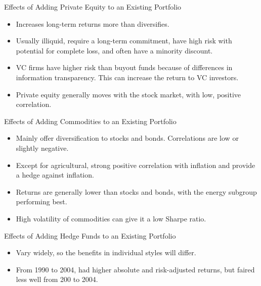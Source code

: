 \documentclass[../custom,grid]{flashcards}
\begin{document}
\begin{flashcard}{Effects of Adding Private Equity to an Existing Portfolio}
    \begin{itemize}
        \item Increases long-term returns more than diversifies.
        \item Usually illiquid, require a long-term commitment, have high risk with potential for complete loss, and often have a minority discount.
        \item VC firms have higher risk than buyout funds because of differences in information transparency. This can increase the return to VC investors.
        \item Private equity generally moves with the stock market, with low, positive correlation.
    \end{itemize}
\end{flashcard}

\begin{flashcard}{Effects of Adding Commodities to an Existing Portfolio}
    \begin{itemize}
        \item Mainly offer diversification to stocks and bonds. Correlations are low or slightly negative.
        \item Except for agricultural, strong positive correlation with inflation and provide a hedge against inflation.
        \item Returns are generally lower than stocks and bonds, with the energy subgroup performing best.
        \item High volatility of commodities can give it a low Sharpe ratio.
    \end{itemize}
\end{flashcard}

\begin{flashcard}{Effects of Adding Hedge Funds to an Existing Portfolio}
    \begin{itemize}
        \item Vary widely, so the benefits in individual styles will differ.
        \item From 1990 to 2004, had higher absolute and risk-adjusted returns, but faired less well from 200 to 2004.
    \end{itemize}
\end{flashcard}
\end{document}
